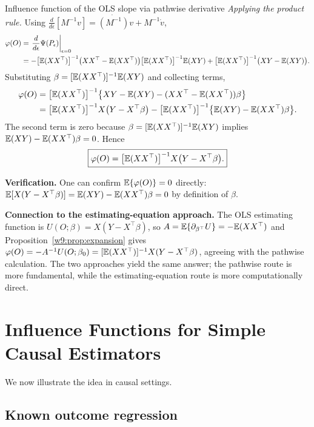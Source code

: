\documentclass[master.tex]{subfiles}
\begin{document}
\begin{example}{Influence function of the OLS slope via pathwise derivative}
\medskip\noindent\textit{Applying the product rule.}
Using $\frac{d}{d\epsilon}[M^{-1}v] = \dot{(M^{-1})}v + M^{-1}\dot v$,
\begin{align*}
  \varphi(O)
  &= \left.\frac{d}{d\epsilon}\Psi(P_\epsilon)\right|_{\epsilon=0} \\
  &= -\bigl[\mathbb{E}(XX^\top)\bigr]^{-1}
     \bigl(XX^\top - \mathbb{E}(XX^\top)\bigr)
     \bigl[\mathbb{E}(XX^\top)\bigr]^{-1}\mathbb{E}(XY)
     +
     \bigl[\mathbb{E}(XX^\top)\bigr]^{-1}\bigl(XY - \mathbb{E}(XY)\bigr).
\end{align*}
Substituting $\beta = [\mathbb{E}(XX^\top)]^{-1}\mathbb{E}(XY)$ and collecting terms,
\begin{align*}
  \varphi(O)
  &= \bigl[\mathbb{E}(XX^\top)\bigr]^{-1}
     \bigl\{XY - \mathbb{E}(XY) - (XX^\top - \mathbb{E}(XX^\top))\beta\bigr\} \\
  &= \bigl[\mathbb{E}(XX^\top)\bigr]^{-1}
     X\bigl(Y - X^\top\beta\bigr)
     - \bigl[\mathbb{E}(XX^\top)\bigr]^{-1}
     \bigl\{\mathbb{E}(XY) - \mathbb{E}(XX^\top)\beta\bigr\}.
\end{align*}
The second term is zero because $\beta = [\mathbb{E}(XX^\top)]^{-1}\mathbb{E}(XY)$
implies $\mathbb{E}(XY) - \mathbb{E}(XX^\top)\beta = 0$.  Hence
\[
  \boxed{\varphi(O)
  =
  \bigl[\mathbb{E}(XX^\top)\bigr]^{-1}X\bigl(Y - X^\top\beta\bigr).}
\]

\medskip\noindent\textbf{Verification.}
One can confirm $\mathbb{E}\{\varphi(O)\} = 0$ directly:
$\mathbb{E}[X(Y - X^\top\beta)] = \mathbb{E}(XY) - \mathbb{E}(XX^\top)\beta = 0$ by
definition of $\beta$.

\medskip\noindent\textbf{Connection to the estimating-equation
approach.}  The OLS estimating function is
$U(O;\beta) = X(Y - X^\top\beta)$, so
$A = \mathbb{E}\{\partial_{\beta^\top}U\} = -\mathbb{E}(XX^\top)$ and
Proposition~\ref{w9:prop:expansion} gives
$\varphi(O) = -A^{-1}U(O;\beta_0) = [\mathbb{E}(XX^\top)]^{-1}X(Y -
X^\top\beta)$, agreeing with the pathwise calculation.  The two
approaches yield the same answer; the pathwise route is more
fundamental, while the estimating-equation route is more
computationally direct.
\end{example}

\section{Influence Functions for Simple Causal Estimators}
\label{w9:sec:if-causal}

We now illustrate the idea in causal settings.

\subsection{Known outcome regression}
\label{w9:subsec:if-reg}
\end{document}

